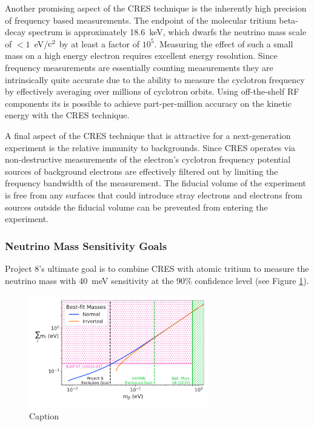 Another promising aspect of the CRES technique is the inherently high precision of frequency based measurements. The endpoint of the molecular tritium beta-decay spectrum is approximately 18.6~keV, which dwarfs the neutrino mass scale of $<1$~eV/$\rm{c}^2$ by at least a factor of $10^5$. Measuring the effect of such a small mass on a high energy electron requires excellent energy resolution. Since frequency measurements are essentially counting measurements they are intrinsically quite accurate due to the ability to measure the cyclotron frequency by effectively averaging over millions of cyclotron orbits. Using off-the-shelf RF components its is possible to achieve part-per-million accuracy on the kinetic energy with the CRES technique.

A final aspect of the CRES technique that is attractive for a next-generation experiment is the relative immunity to backgrounds. Since CRES operates via non-destructive measurements of the electron's cyclotron frequency potential sources of background electrons are effectively filtered out by limiting the frequency bandwidth of the measurement. The fiducial volume of the experiment is free from any surfaces that could introduce stray electrons and electrons from sources outside the fiducial volume can be prevented from entering the experiment.

\subsubsection*{Neutrino Mass Sensitivity Goals}

Project 8's ultimate goal is to combine CRES with atomic tritium to measure the neutrino mass with 40~meV sensitivity at the 90\% confidence level (see Figure \ref{fig:chap3-p8-nu-mass-goal}).

\begin{figure}[htbp]
    \centering
    \includegraphics[width=0.7\textwidth]{figs/Chapter-3/230303_sum_nu_mass_vs_m_beta_with_exclusion_and_goal.png}
    \caption{Caption}
    \label{fig:chap3-p8-nu-mass-goal}
\end{figure}

